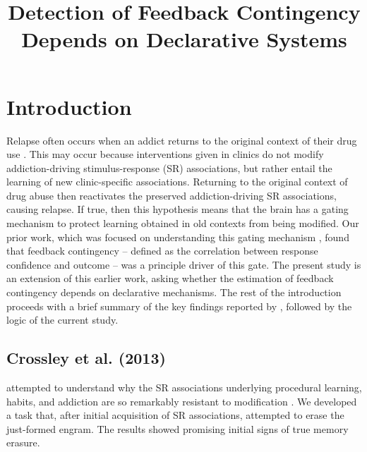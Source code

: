 \documentclass[man,apacite,draftfirst]{apa6}
\title{Detection of Feedback Contingency Depends on Declarative Systems}
\begin{document}
\maketitle

\section*{Introduction}
Relapse often occurs when an addict returns to the original context of their
drug use \cite{higgins_outpatient_1995}. This may occur because interventions
given in clinics do not modify addiction-driving stimulus-response (SR)
associations, but rather entail the learning of new clinic-specific
associations. Returning to the original context of drug abuse then reactivates
the preserved addiction-driving SR associations, causing relapse. If true, then
this hypothesis means that the brain has a gating mechanism to protect learning
obtained in old contexts from being modified. Our prior work, which was focused
on understanding this gating mechanism \cite{crossley_erasing_2013}, found that
feedback contingency -- defined as the correlation between response confidence
and outcome -- was a principle driver of this gate. The present study is an
extension of this earlier work, asking whether the estimation of feedback
contingency depends on declarative mechanisms. The rest of the introduction
proceeds with a brief summary of the key findings reported by
\cite{crossley_erasing_2013}, followed by the logic of the current study.

\subsection*{Crossley et al. (2013)}
\cite{crossley_erasing_2013} attempted to understand why the SR associations
underlying procedural learning, habits, and addiction are so remarkably
resistant to modification \cite{crossley_erasing_2013}. We developed a task
that, after initial acquisition of SR associations, attempted to erase the
just-formed engram. The results showed promising initial signs of true memory
erasure.
\end{document}
